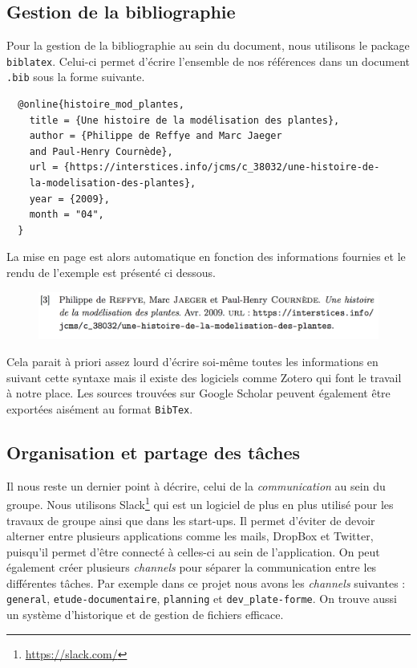 \subsection{Gestion de la bibliographie}
Pour la gestion de la bibliographie au sein du document,
nous utilisons le package \texttt{biblatex}.
Celui-ci permet d'écrire l'ensemble de nos références dans un document \texttt{.bib}
sous la forme suivante.
\begin{verbatim}
  @online{histoire_mod_plantes,
    title = {Une histoire de la modélisation des plantes},
    author = {Philippe de Reffye and Marc Jaeger 
    and Paul-Henry Cournède},
    url = {https://interstices.info/jcms/c_38032/une-histoire-de-
    la-modelisation-des-plantes},
    year = {2009},
    month = "04",
  }
\end{verbatim}
La mise en page est alors automatique en fonction des informations fournies
et le rendu de l'exemple est présenté ci dessous.
\begin{figure}[h]
  \includegraphics[scale=0.6]{./img/rendu_elem_bib.jpg}
\end{figure}

Cela parait à priori assez lourd d'écrire soi-même toutes les informations
en suivant cette syntaxe mais il existe des logiciels comme Zotero
qui font le travail à notre place.
Les sources trouvées sur Google Scholar peuvent également être exportées
aisément au format \texttt{BibTex}.
           
\subsection{Organisation et partage des tâches}
Il nous reste un dernier point à décrire, celui de la \emph{communication}
au sein du groupe.
Nous utilisons Slack\footnote{\url{https://slack.com/}} qui est un logiciel
de plus en plus utilisé pour les travaux de groupe ainsi que dans les start-ups.
Il permet d'éviter de devoir alterner entre plusieurs applications comme les mails,
DropBox et Twitter, puisqu'il permet d'être connecté
à celles-ci au sein de l'application.
On peut également créer plusieurs \emph{channels} pour séparer la communication
entre les différentes tâches.
Par exemple dans ce projet nous avons les \emph{channels} suivantes :
\texttt{general}, \texttt{etude-documentaire}, 
\texttt{planning} et \texttt{dev\_plate-forme}.
On trouve aussi un système d'historique et de gestion de fichiers efficace.

